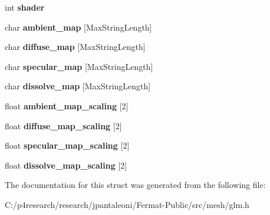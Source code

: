 \begin{DoxyCompactItemize}
\item 
\mbox{\label{struct___g_l_mmaterial_a775fda345036bb17e365d4a7132e777a}} 
int {\bfseries shader}
\item 
\mbox{\label{struct___g_l_mmaterial_aaee1d35ad8f052c437ca878fd4f27a50}} 
char {\bfseries ambient\+\_\+map} \mbox{[}Max\+String\+Length\mbox{]}
\item 
\mbox{\label{struct___g_l_mmaterial_a1fedd76c7eb3974e3451caded898bade}} 
char {\bfseries diffuse\+\_\+map} \mbox{[}Max\+String\+Length\mbox{]}
\item 
\mbox{\label{struct___g_l_mmaterial_a694f4c938e13d6c9fde8c0cabc7b45a4}} 
char {\bfseries specular\+\_\+map} \mbox{[}Max\+String\+Length\mbox{]}
\item 
\mbox{\label{struct___g_l_mmaterial_a4583131e8e408d4ebf7a6d7eda57cebb}} 
char {\bfseries dissolve\+\_\+map} \mbox{[}Max\+String\+Length\mbox{]}
\item 
\mbox{\label{struct___g_l_mmaterial_a8649002dcc608133d5f2e0078d8fc01e}} 
float {\bfseries ambient\+\_\+map\+\_\+scaling} \mbox{[}2\mbox{]}
\item 
\mbox{\label{struct___g_l_mmaterial_a1997e10b86913f9aa56a5bc479930470}} 
float {\bfseries diffuse\+\_\+map\+\_\+scaling} \mbox{[}2\mbox{]}
\item 
\mbox{\label{struct___g_l_mmaterial_a710aae0219c05b1f041d17f83b49ffa7}} 
float {\bfseries specular\+\_\+map\+\_\+scaling} \mbox{[}2\mbox{]}
\item 
\mbox{\label{struct___g_l_mmaterial_ab210946d05b0a1c5cd83b0db5fedf308}} 
float {\bfseries dissolve\+\_\+map\+\_\+scaling} \mbox{[}2\mbox{]}
\end{DoxyCompactItemize}


The documentation for this struct was generated from the following file\+:\begin{DoxyCompactItemize}
\item 
C\+:/p4research/research/jpantaleoni/\+Fermat-\/\+Public/src/mesh/glm.\+h\end{DoxyCompactItemize}
